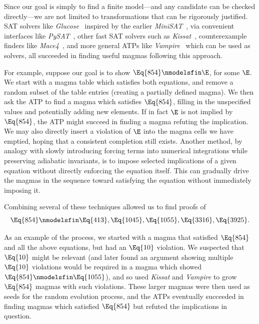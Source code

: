  Since our goal is simply to find a finite model---and any candidate can be checked directly---we are not limited to transformations that can be rigorously justified.
  SAT solvers like
 \emph{Glucose}~\cite{DBLP:conf/ijcai/AudemardS09,DBLP:conf/cp/AudemardS12} inspired by the earlier \emph{MiniSAT}~\cite{DBLP:conf/sat/EenS03},
 via convenient interfaces like \emph{PySAT}~\cite{imms-sat18, itk-sat24},
 other fast SAT solvers such as \emph{Kissat}~\cite{BiereFazekasFleuryHeisinger-SAT-Competition-2020-solvers},
 counterexample finders like \emph{Mace4}~\cite{prover9-mace4}, and more general ATPs like
 \emph{Vampire}~\cite{DBLP:conf/cav/KovacsV13} which can be used as solvers, all succeeded in finding useful magmas following this approach.

 For example, suppose our goal is to show $\Eq{854} \nmodelsfin \E$, for some $\E$.  We start with a magma table which
 satisfies both equations, and remove a random subset of the table entries (creating a partially defined magma).  We then
 ask the ATP to find a magma which satisfies $\Eq{854}$, filling in the unspecified values and potentially adding new elements.
 If in fact $\E$ is not implied by $\Eq{854}$, the ATP might succeed in finding a magma refuting the implication.
 We may also directly insert a violation of $\E$ into the magma cells we have emptied, hoping that a consistent completion still exists.
 Another method, by analogy with slowly introducing forcing terms into numerical integrations while preserving adiabatic invariants,
 is to impose selected implications of a given equation without directly enforcing the equation itself.
 This can gradually drive the magmas in the sequence toward satisfying the equation without immediately imposing it.

Combining several of these techniques allowed us to find proofs of
$$\Eq{854} \nmodelsfin \Eq{413}, \Eq{1045}, \Eq{1055}, \Eq{3316}, \Eq{3925}.$$

As an example of the process, we started with a magma that satisfied $\Eq{854}$ and all the above equations,
but had an $\Eq{10}$ violation.  We suspected that $\Eq{10}$ might be relevant (and later found an
argument showing multiple $\Eq{10}$ violations would be required in a magma which showed $\Eq{854} \nmodelsfin \Eq{1055}$),
and so used \emph{Kissat} and \emph{Vampire} to grow $\Eq{854}$ magmas with such violations.  These larger magmas were then used as
seeds for the random evolution process, and the ATPs eventually succeeded in finding magmas which satisfied $\Eq{854}$ but refuted
the implications in question.

